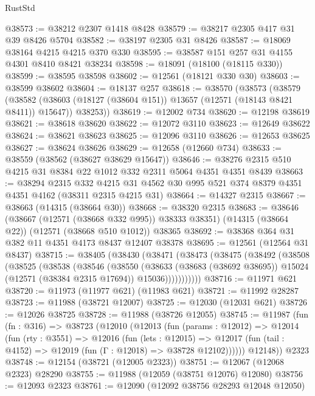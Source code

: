 \begin{lexlean}{RustStd}
\begin{coremodule}
@38573 := @38212 @2307 @1418 @8428
@38579 := @38217 @2305 @417 @31 @39 @8426 @5704
@38582 := @38197 @2305 @31 @8426
@38587 := @18069 @38164 @4215 @4215 @370 @330
@38595 := @38587 @151 @257 @31 @4155 @4301 @8410 @8421 @38234
@38598 := @18091 (@18100 (@18115 @330))
@38599 := @38595 @38598
@38602 := @12561 (@18121 @330 @30)
@38603 := @38599 @38602
@38604 := @18137 @257
@38618 := @38570
    (@38573
      (@38579
        (@38582 (@38603 (@18127 (@38604 @151)) @13657 (@12571 (@18143 @8421 @8411)) @15647))
        @38253))
@38619 := @12002 @734
@38620 := @12198 @38619
@38621 := @38618 @38620
@38622 := @12072 @3110
@38623 := @12649 @38622
@38624 := @38621 @38623
@38625 := @12096 @3110
@38626 := @12653 @38625
@38627 := @38624 @38626
@38629 := @12658 (@12660 @734)
@38633 := @38559 (@38562 (@38627 @38629 @15647))
@38646 := @38276 @2315 @510 @4215 @31 @8384 @22 @1012 @332 @2311 @5064 @4351 @4351 @8439
@38663 := @38294
    @2315
    @332
    @4215
    @31
    @4562
    @30
    @995
    @521
    @374
    @8379
    @4351
    @4351
    @4162
    (@38311 @2315 @4215 @31)
@38664 := @14327 @2315
@38667 := @38663 (@14315 (@38664 @30))
@38668 := @38320 @2315
@38683 := @38646
    (@38667 (@12571 (@38668 @332 @995)) @38333 @38351)
    (@14315 (@38664 @22))
    (@12571 (@38668 @510 @1012))
    @38365
@38692 := @38368 @364 @31 @382 @11 @4351 @4173 @8437 @12407 @38378
@38695 := @12561 (@12564 @31 @8437)
@38715 := @38405
    (@38430
      (@38471
        (@38473
          (@38475
            (@38492
              (@38508
                (@38525
                  (@38538
                    (@38546
                      (@38550
                        (@38633
                          (@38683 (@38692 @38695))
                          @15024
                          (@12571 (@38384 @2315 @17694))
                          @15036)))))))))))
@38716 := @11971 @621
@38720 := @11973 (@11977 @621) (@11983 @621)
@38721 := @11992 @28287
@38723 := @11988 (@38721 @12007)
@38725 := @12030 (@12031 @621)
@38726 := @12026 @38725
@38728 := @11988 (@38726 @12055)
@38745 := @11987
    (fun (fn : @316) =>
    @38723
      (@12010
        (@12013
          (fun (params : @12012) =>
          @12014
            (fun (rty : @3551) =>
            @12016
              (fun (lets : @12015) =>
              @12017 (fun (tail : @4152) => @12019 (fun (Γ : @12018) => @38728 @12102))))))
        @12148))
    @2323
@38748 := @12154 (@38721 (@12005 @2323))
@38751 := @12067 (@12068 @2323) @28290
@38755 := @11988 (@12059 (@38751 @12076) @12080)
@38756 := @12093 @2323
@38761 := @12090 (@12092 @38756 @28293 @12048 @12050)

\end{coremodule}
\end{lexlean}
